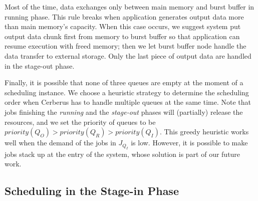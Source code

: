 Most of the time, data exchanges only between main memory and burst buffer in running phase.
This rule breaks when application generates output data more than main memory's capacity.
When this case occurs, we suggest system put output data chunk first from memory to burst buffer
so that application can resume execution with freed memory;
then we let burst buffer node handle the data transfer to external storage.
Only the last piece of output data are handled in the stage-out phase.

Finally, it is possible that none of three queues are empty at the moment of a scheduling instance.
We choose a heuristic strategy to determine the scheduling order when
Cerberus has to handle multiple queues at the same time.
Note that jobs finishing the \textit{running} and the \textit{stage-out} phases
will (partially) release the resources, and we set the priority of queues to be $priority(Q_O) > priority(Q_R) > priority(Q_I)$.
This greedy heuristic works well when the demand of the jobs in $J_{Q_I}$ is low.
However, it is possible to make jobs stack up at the entry of the system,
whose solution is part of our future work.


\subsection{Scheduling in the Stage-in Phase}
\label{SubSec:OptStageIn}

